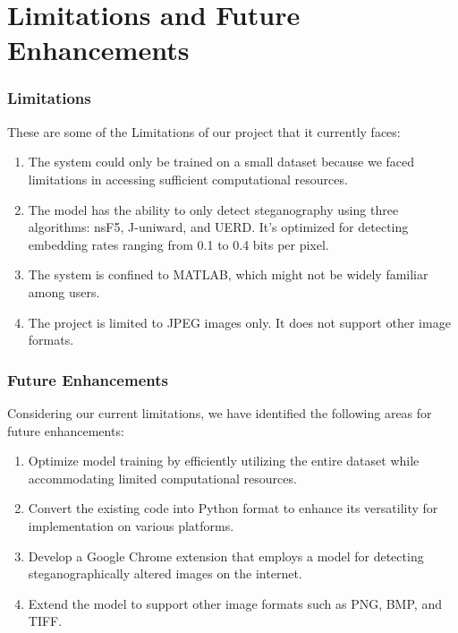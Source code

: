 \chapter{Limitations and Future Enhancements}
\subsection{Limitations}
These are some of the Limitations of our project that it currently faces:
\begin{enumerate}[noitemsep]
    \item The system could only be trained on a small dataset because we faced limitations in accessing sufficient computational resources.
    \item The model has the ability to only detect steganography using three algorithms: nsF5, J-uniward, and UERD. It's optimized for detecting embedding rates ranging from 0.1 to 0.4 bits per pixel.
    \item The system is confined to MATLAB, which might not be widely familiar among users.
    \item The project is limited to JPEG images only. It does not support other image formats.
\end{enumerate}

\subsection{Future Enhancements}
Considering our current limitations, we have identified the following areas for future enhancements:
\begin{enumerate}[noitemsep]
    \item Optimize model training by efficiently utilizing the entire dataset while accommodating limited computational resources.
    \item Convert the existing code into Python format to enhance its versatility for implementation on various platforms.
    \item Develop a Google Chrome extension that employs a model for detecting steganographically altered images on the internet.
    \item Extend the model to support other image formats such as PNG, BMP, and TIFF.
\end{enumerate}

